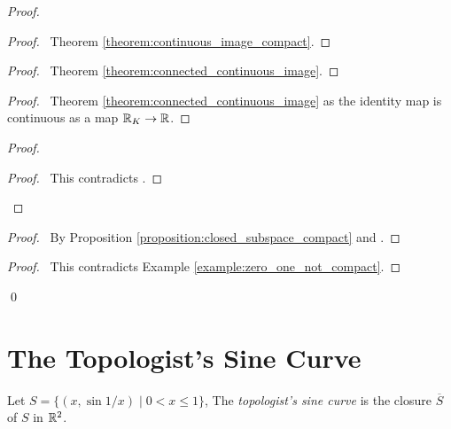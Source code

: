 \begin{proof}
    \pf
    \begin{proof}
        \pf\ Theorem \ref{theorem:continuous_image_compact}.
    \end{proof}
    \begin{proof}
        \pf\ Theorem \ref{theorem:connected_continuous_image}.
    \end{proof}
    \begin{proof}
        \pf\ Theorem \ref{theorem:connected_continuous_image} as
        the identity map is continuous as a map $\mathbb{R}_K \rightarrow \mathbb{R}$.
    \end{proof}
    \begin{proof}
        \qedstep
        \begin{proof}
            \pf\ This contradicts .
        \end{proof}
    \end{proof}
    \begin{proof}
        \pf\ By Proposition \ref{proposition:closed_subspace_compact}
        and .
    \end{proof}
    \qedstep
    \begin{proof}
        \pf\ This contradicts Example \ref{example:zero_one_not_compact}.
    \end{proof}
    \qed
\end{proof}

\section{The Topologist's Sine Curve}

\begin{definition}
    Let $S = \{ (x, \sin 1/x) \mid 0 < x \leq 1 \}$, The \emph{topologist's sine curve} is the closure $\overline{S}$ of $S$ in $\mathbb{R}^2$.
\end{definition}

